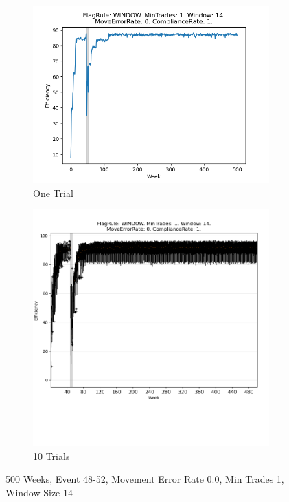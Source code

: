 \documentclass{article}%
\begin{document}
%


\begin{figure}[!htb]%
\begin{subfigure}[b]{0.45\linewidth}%
\includegraphics[width=\linewidth]{1050fr_WINDOW_mt_1_ws_14_er_0_cr_1_t1.png}%
\caption{One Trial}%
\end{subfigure}%
\begin{subfigure}[b]{0.45\linewidth}%
\includegraphics[clip,width=\linewidth,trim=0 4cm 0 0]{1050fr_WINDOW_mt_1_ws_14_er_0_cr_1_t10.png}%
\caption{10 Trials}%
\end{subfigure}%
\caption{500 Weeks, Event 48{-}52, Movement Error Rate 0.0, Min Trades 1, Window Size 14}%
\end{figure}
\end{document}

